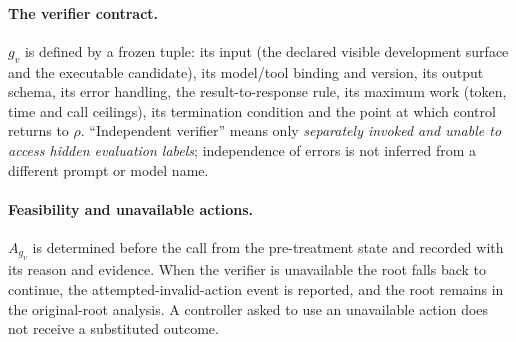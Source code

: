 \paragraph{The verifier contract.}
$g_v$ is defined by a frozen tuple: its input (the declared visible development
surface and the executable candidate), its model/tool binding and version, its
output schema, its error handling, the result-to-response rule, its maximum work
(token, time and call ceilings), its termination condition and the point at
which control returns to $\rho$.  ``Independent verifier'' means only
\emph{separately invoked and unable to access hidden evaluation labels};
independence of errors is not inferred from a different prompt or model name.

\paragraph{Feasibility and unavailable actions.}
$A_{g_v}$ is determined before the call from the pre-treatment state and recorded
with its reason and evidence.  When the verifier is unavailable the root falls
back to continue, the attempted-invalid-action event is reported, and the root
remains in the original-root analysis.  A controller asked to use an unavailable
action does not receive a substituted outcome.


